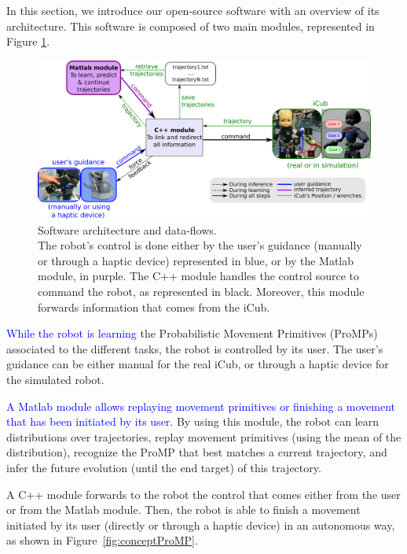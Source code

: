\documentclass[utf8]{frontiersSCNS} %
\newcommand{\rev}[1]{\textcolor{blue}{#1}}
\newcommand{\todo}[1]{\textcolor{red}{\textbf{/*#1*/}}}
\begin{document}
In this section, we introduce our open-source software with an overview of its architecture. This software is composed of two main modules, represented in Figure \ref{fig:orgaSoftware}.

\label{sec:software}
\begin{figure}[h]
\center
\includegraphics[width=\hsize]{img/liaisonAllProgramV3.pdf}
\caption{Software architecture and data-flows.\\ The robot's control is done either by the user's guidance (manually or through a haptic device) represented in blue, or by the Matlab module, in purple. The C++ module handles the control source to command the robot, as represented in black. Moreover, this module forwards information that comes from the iCub.}
\label{fig:orgaSoftware}
\end{figure}

\rev{While the robot is learning} the Probabilistic Movement Primitives (ProMPs) associated to the different tasks, the robot is controlled by its user. The user's guidance can be either manual for the real iCub, or through a haptic device for the simulated robot. 

\rev{A Matlab module allows replaying movement primitives or finishing a movement that has been initiated by its user}. By using this module, the robot can learn distributions over trajectories, replay movement primitives (using the mean of the distribution), recognize the ProMP that best matches a current trajectory, and infer the future evolution (until the end target) of this trajectory.

A C++ module forwards to the robot the control that comes either from the user or from the Matlab module. Then, the robot is able to finish a movement initiated by its user (directly or through a haptic device) in an autonomous way, as shown in Figure~\ref{fig:conceptProMP}. %
\end{document}
